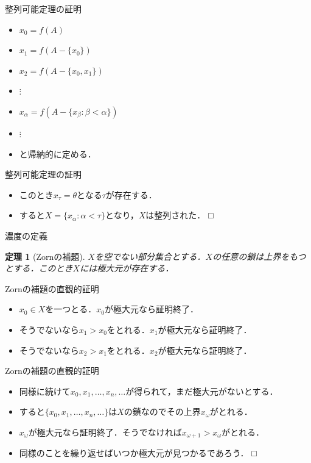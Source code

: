 \documentclass[dvipdfmx,17pt]{beamer}
\theoremstyle{plain}
\newtheorem{thm}{定理}
\begin{document}
\begin{frame}{整列可能定理の証明}
\begin{itemize}
\item $x_0 = f(A)$
\item $x_1 = f(A - \{x_0\})$
\item $x_2 = f(A - \{x_0, x_1\})$
\item $\vdots$
\item $x_\alpha = f(A - \{x_\beta : \beta < \alpha\})$
\item $\vdots$
\item と帰納的に定める．
\end{itemize}
\end{frame}

\begin{frame}{整列可能定理の証明}
\begin{itemize}
\item このとき$x_\tau = \theta$となる$\tau$が存在する．
\item すると$X = \{x_\alpha : \alpha < \tau\}$となり，$X$は整列された． □
\end{itemize}
\end{frame}

\begin{frame}{濃度の定義}

\end{frame}

\begin{frame}
\begin{thm}[Zornの補題]
$X$を空でない部分集合とする．$X$の任意の鎖は上界をもつとする．このとき$X$には極大元が存在する．
\end{thm}
\end{frame}

\begin{frame}{Zornの補題の直観的証明}
\begin{itemize}
\item $x_0 \in X$を一つとる．$x_0$が極大元なら証明終了．
\item そうでないなら$x_1 > x_0$をとれる．$x_1$が極大元なら証明終了．
\item そうでないなら$x_2 > x_1$をとれる．$x_2$が極大元なら証明終了．
\end{itemize}
\end{frame}

\begin{frame}{Zornの補題の直観的証明}
\begin{itemize}
\item 同様に続けて$x_0, x_1, \dots, x_n, \dots$が得られて，まだ極大元がないとする．
\item すると$\{x_0, x_1, \dots, x_n, \dots\}$は$X$の鎖なのでその上界$x_\omega$がとれる．
\item $x_\omega$が極大元なら証明終了．そうでなければ$x_{\omega + 1} > x_\omega$がとれる．
\item 同様のことを繰り返せばいつか極大元が見つかるであろう． □
\end{itemize}
\end{frame}
\end{document}
